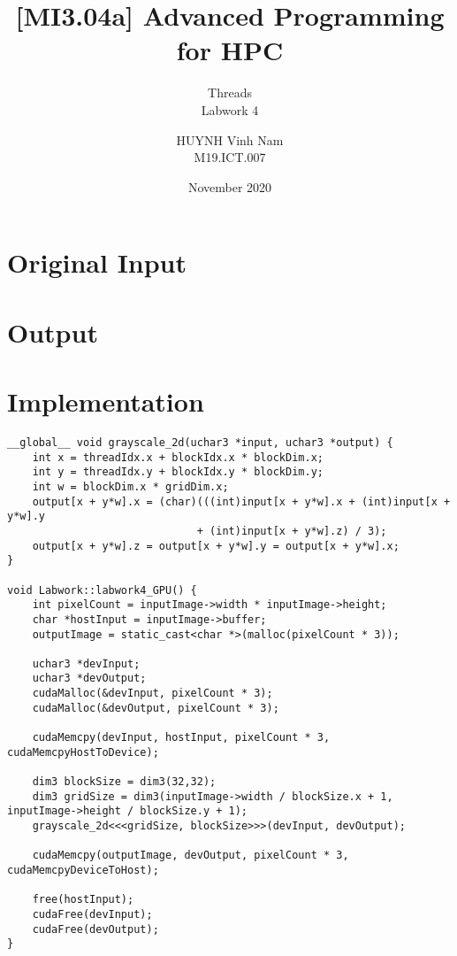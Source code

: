 \documentclass[10pt, a4paper]{article}
\title{[MI3.04a] Advanced Programming for HPC}
\subtitle{Threads \\ Labwork 4}
\author{HUYNH Vinh Nam \\ M19.ICT.007}
\date{November 2020}
\begin{document}
\maketitle


\section*{Original Input}
    \begin{center}
        \begin{figure}[H]
            \centering
            \label{fig:cuda-input}
        \end{figure}
    \end{center}
    
\section*{Output}
    \begin{center}
        \begin{figure}[H]
            \centering
            \label{fig:cuda-outputs}
        \end{figure}
    \end{center}

\hfill
\section*{Implementation}

\begin{verbatim}
__global__ void grayscale_2d(uchar3 *input, uchar3 *output) {
    int x = threadIdx.x + blockIdx.x * blockDim.x;
    int y = threadIdx.y + blockIdx.y * blockDim.y;
    int w = blockDim.x * gridDim.x;
    output[x + y*w].x = (char)(((int)input[x + y*w].x + (int)input[x + y*w].y 
                              + (int)input[x + y*w].z) / 3);
    output[x + y*w].z = output[x + y*w].y = output[x + y*w].x;
}

void Labwork::labwork4_GPU() {
    int pixelCount = inputImage->width * inputImage->height;
    char *hostInput = inputImage->buffer;
    outputImage = static_cast<char *>(malloc(pixelCount * 3));

    uchar3 *devInput;
    uchar3 *devOutput;
    cudaMalloc(&devInput, pixelCount * 3);
    cudaMalloc(&devOutput, pixelCount * 3);
    
    cudaMemcpy(devInput, hostInput, pixelCount * 3, cudaMemcpyHostToDevice);

    dim3 blockSize = dim3(32,32);
    dim3 gridSize = dim3(inputImage->width / blockSize.x + 1, inputImage->height / blockSize.y + 1);
    grayscale_2d<<<gridSize, blockSize>>>(devInput, devOutput);

    cudaMemcpy(outputImage, devOutput, pixelCount * 3, cudaMemcpyDeviceToHost);

    free(hostInput);
    cudaFree(devInput);
    cudaFree(devOutput);
}

\end{verbatim}
\end{document}

